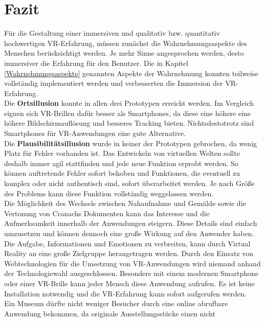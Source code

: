 \documentclass[a4paper,12pt,oneside]{article}
\begin{document}
  \section{Fazit}
    Für die Gestaltung einer immersiven und qualitativ bzw. 
    quantitativ hochwertigen VR-Erfahrung, müssen zunächst 
    die Wahrnehmungsaspekte des Menschen berücksichtigt werden.
    Je mehr Sinne angesprochen werden,
    desto immersiver die Erfahrung für den Benutzer. 
    Die in Kapitel \ref{Wahrnehmungsaspekte} genannten Aspekte der Wahrnehmung
    konnten teilweise vollständig implementiert werden und verbesserten
    die Immersion der VR-Erfahrung. \\
    Die \textbf{Ortsillusion} konnte in allen drei Prototypen erreicht 
    werden. 
    Im Vergleich eignen sich VR-Brillen dafür besser als Smartphones,
    da diese eine höhere eine höhere
    Bildschirmauflösung und besseres Tracking bieten.
    Nichtsdestotrotz sind Smartphones für VR-Anwendungen 
    eine gute Alternative. \\
    Die \textbf{Plausibilitätsillusion} wurde in keiner der 
    Prototypen gebrochen, da wenig Platz für Fehler 
    vorhanden ist. Das Entwickeln von virtuellen Welten sollte
    deshalb immer agil stattfinden und jede neue Funktion erprobt 
    werden. So können auftretende Fehler sofort behoben
    und Funktionen, die eventuell zu komplex oder nicht authentisch
    sind, sofort überarbeitet werden. Je nach Größe des Problems
    kann diese Funktion vollständig weggelassen werden. \\
    Die Möglichkeit des Wechsels zwischen Nahaufnahme und Gemälde
    sowie die Vertonung von Cranachs Dokumenten kann
    das Interesse und die Aufmerksamkeit 
    innerhalb der Anwendungen steigern.
    Diese Details sind einfach umzusetzen
    und können dennoch eine große Wirkung auf den Anwender haben. \\
    Die Aufgabe, Informationen und Emotionen zu verbreiten, kann durch
    Virtual Reality an eine große Zielgruppe herangetragen werden. 
    Durch den Einsatz von Webtechnologien für die 
    Umsetzung von VR-Anwendungen wird niemand anhand 
    der Technologiewahl ausgeschlossen.
    Besonders mit einem modernen Smartphone 
    oder einer VR-Brille kann jeder Mensch
    diese Anwendung aufrufen. Es ist keine Installation notwendig
    und die VR-Erfahrung kann sofort aufgerufen werden. \\
    Ein Museum dürfte nicht weniger Besucher durch eine online abrufbare
    Anwendung bekommen, da originale Ausstellungsstücke einen nicht
\end{document}
